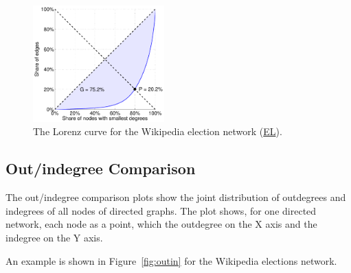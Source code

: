\documentclass{article}
\newcommand{\wPlot}{0.45\textwidth}
\begin{document}
\begin{figure}
  \centering 
  \includegraphics[width=\wPlot]{plot/lorenz.a.elec}
  \caption{ 
    The Lorenz curve for the Wikipedia election network
    (\href{http://konect.cc/networks/elec/}{\textsf{EL}}).
    \label{fig:lorenz}
  }
\end{figure}

\subsection{Out/indegree Comparison}
The out/indegree comparison plots show the joint distribution of
outdegrees and indegrees of all nodes of directed graphs.  The plot
shows, for one directed network, each node as a point, which the
outdegree on the X axis and the indegree on the Y axis.  

An example is shown in Figure~\ref{fig:outin} for the Wikipedia
elections network. 
\end{document}
